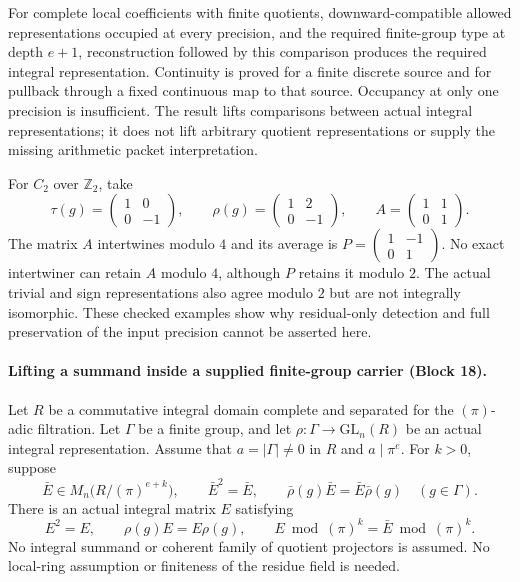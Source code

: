 \documentclass[11pt]{article}
\theoremstyle{definition}
\theoremstyle{remark}
\begin{document}
For complete local coefficients with finite quotients, downward-compatible
allowed representations occupied at every precision, and the required
finite-group type at depth $e+1$, reconstruction followed by this comparison
produces the required integral representation. Continuity is proved for a
finite discrete source and for pullback through a fixed continuous map to
that source. Occupancy at only one precision is insufficient. The result
lifts comparisons between actual integral representations; it does not lift
arbitrary quotient representations or supply the missing arithmetic packet
interpretation.

For $C_2$ over $\mathbb Z_2$, take
\[
\tau(g)=\begin{pmatrix}1&0\\0&-1\end{pmatrix},\qquad
\rho(g)=\begin{pmatrix}1&2\\0&-1\end{pmatrix},\qquad
A=\begin{pmatrix}1&1\\0&1\end{pmatrix}.
\]
The matrix $A$ intertwines modulo $4$ and its average is
$P=\left(\begin{smallmatrix}1&-1\\0&1\end{smallmatrix}\right)$.
No exact intertwiner can retain $A$ modulo $4$, although $P$ retains it
modulo $2$. The actual trivial and sign representations also agree modulo
$2$ but are not integrally isomorphic. These checked examples show why
residual-only detection and full preservation of the input precision cannot
be asserted here.


\paragraph{Lifting a summand inside a supplied finite-group carrier (Block 18).}
Let $R$ be a commutative integral domain complete and separated for the
$(\pi)$-adic filtration. Let $\Gamma$ be a finite group, and let
$\rho:\Gamma\to\mathrm{GL}_n(R)$ be an actual integral representation.
Assume that $a=|\Gamma|\ne0$ in $R$ and $a\mid\pi^e$. For $k>0$, suppose
\[
\bar E\in M_n\bigl(R/(\pi)^{e+k}\bigr),\qquad
\bar E^2=\bar E,\qquad
\bar\rho(g)\bar E=\bar E\bar\rho(g)\quad(g\in\Gamma).
\]
There is an actual integral matrix $E$ satisfying
\[
E^2=E,\qquad \rho(g)E=E\rho(g),\qquad
E\bmod(\pi)^k=\bar E\bmod(\pi)^k.
\]
No integral summand or coherent family of quotient projectors is assumed.
No local-ring assumption or finiteness of the residue field is needed.
\end{document}
